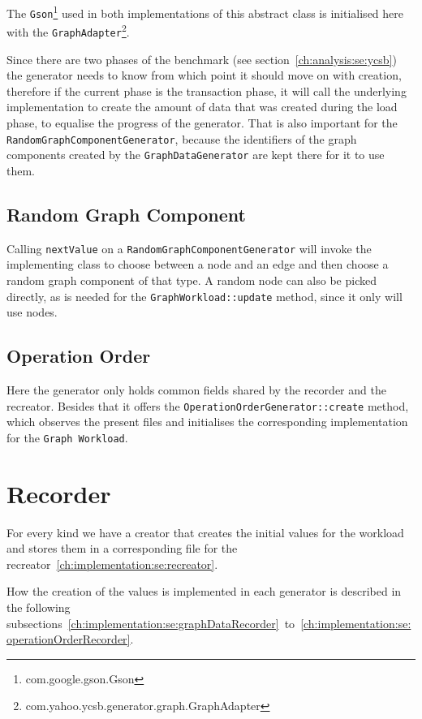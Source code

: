 The \texttt{Gson}\footnote{com.google.gson.Gson} used in both implementations of this abstract class is initialised here with the \texttt{GraphAdapter}\footnote{com.yahoo.ycsb.generator.graph.GraphAdapter}.

Since there are two phases of the benchmark (see section~\ref{ch:analysis:se:ycsb}) the generator needs to know from which point it should move on with creation,
therefore if the current phase is the transaction phase,
it will call the underlying implementation to create the amount of data that was created during the load phase,
to equalise the progress of the generator.
That is also important for the \texttt{RandomGraphComponentGenerator},
because the identifiers of the graph components created by the \texttt{GraphDataGenerator} are kept there for it to use them.

\subsection{Random Graph Component}
Calling \texttt{nextValue} on a \texttt{RandomGraphComponentGenerator} will invoke the implementing class to choose between a node and an edge and then choose a random graph component of that type.
A random node can also be picked directly,
as is needed for the \texttt{GraphWorkload::update} method,
since it only will use nodes.

\subsection{Operation Order}
Here the generator only holds common fields shared by the recorder and the recreator.
Besides that it offers the \texttt{OperationOrderGenerator::create} method,
which observes the present files and initialises the corresponding implementation for the \texttt{Graph Workload}.

\section{Recorder}
\label{ch:implementation:se:recorder}
For every kind we have a creator that creates the initial values for the workload and stores them in a corresponding file for the recreator~\ref{ch:implementation:se:recreator}.

How the creation of the values is implemented in each generator is described in the following subsections~\ref{ch:implementation:se:graphDataRecorder}~to~\ref{ch:implementation:se:operationOrderRecorder}.

